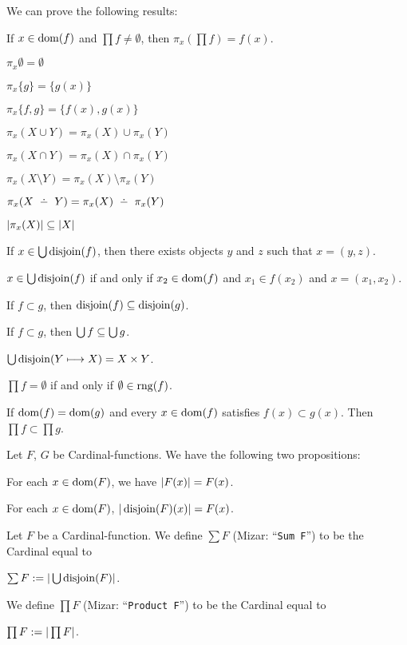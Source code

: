 \documentclass{article}
\begin{document}
We can prove the following results:
\begin{thm}
\item\label{card3:12} If $x\in\operatorname{dom}(f)$ and $\prod f\neq\emptyset$,
  then $\pi_{x}(\prod f)=f(x)$.
\item\label{card3:13} $\pi_{x}\emptyset=\emptyset$
\item\label{card3:14} $\pi_{x}\{g\}=\{g(x)\}$
\item\label{card3:15} $\pi_{x}\{f,g\}=\{f(x),g(x)\}$
\item\label{card3:16} $\pi_{x}(X\cup Y)=\pi_{x}(X)\cup\pi_{x}(Y)$
\item\label{card3:17} $\pi_{x}(X\cap Y)=\pi_{x}(X)\cap\pi_{x}(Y)$
\item\label{card3:18} $\pi_{x}(X\setminus Y)=\pi_{x}(X)\setminus\pi_{x}(Y)$
\item\label{card3:19} $\pi_{x}(X\symdiff Y)=\pi_{x}(X)\symdiff\pi_{x}(Y)$
\item\label{card3:20} $|\pi_{x}(X)|\subseteq|X|$
\item\label{card3:21} If $x\in\Union\disjoin{f}$, then there exists
  objects $y$ and $z$ such that $x=(y,z)$.
\item\label{card3:22} $x\in\Union\disjoin{f}$ if and only if
  $x_{2}\in\operatorname{dom}(f)$ and $x_{1}\in f(x_{2})$ and $x=(x_{1},x_{2})$.
\item\label{card3:23} If $f\subset g$, then $\operatorname{disjoin}(f)\subseteq\operatorname{disjoin}(g)$.
\item\label{card3:24} If $f\subset g$, then $\Union f\subset\Union g$.
\item\label{card3:25} $\Union\disjoin{Y\constantto X}=X\times Y$.
\item\label{card3:26} $\prod f=\emptyset$ if and only if $\emptyset\in\operatorname{rng}(f)$.
\item\label{card3:27} If $\operatorname{dom}(f)=\operatorname{dom}(g)$ and every $x\in\operatorname{dom}(f)$
  satisfies $f(x)\subset g(x)$.
  Then $\prod f\subset\prod g$.
\end{thm}

Let $F$, $G$ be Cardinal-functions. We have the following two propositions:
\begin{thm}
\item\label{card3:28} For each $x\in\operatorname{dom}(F)$, we have $|F(x)|=F(x)$.
\item\label{card3:29} For each $x\in\operatorname{dom}(F)$, $|\operatorname{disjoin}(F)(x)|=F(x)$.
\end{thm}

\begin{definition}
Let $F$ be a Cardinal-function.
We define $\sum F$ (Mizar: ``\verb#Sum F#'') to be the Cardinal equal to
\begin{defn}
\item $\sum F :=\card{\Union\disjoin{F}}$.
\end{defn}
We define $\prod F$ (Mizar: ``\verb#Product F#'') to be the Cardinal
equal to
\begin{defn}
\item $\prod F := |\prod F|$.
\end{defn}
\end{definition}
\end{document}

